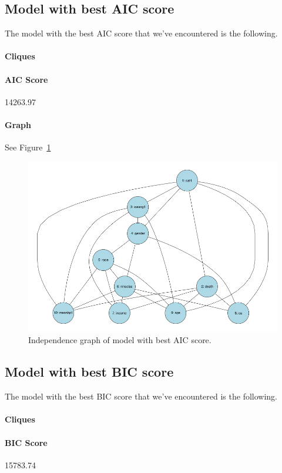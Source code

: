 \documentclass[12pt]{article}
\theoremstyle{definition}
\begin{document}
\subsection*{Model with best AIC score}
The model with the best AIC score that we've encountered is the following.

\paragraph{Cliques}

\paragraph{AIC Score} 14263.97

\paragraph{Graph} See Figure~\ref{fig:aic_best}

\begin{figure}[H]
    \centering
    \includegraphics[width=0.8\linewidth]{aic_best.png}
    \caption{Independence graph of model with best AIC score.}
\label{fig:aic_best}
\end{figure}

\subsection*{Model with best BIC score}
The model with the best BIC score that we've encountered is the following.

\paragraph{Cliques}

\paragraph{BIC Score} 15783.74
\end{document}
